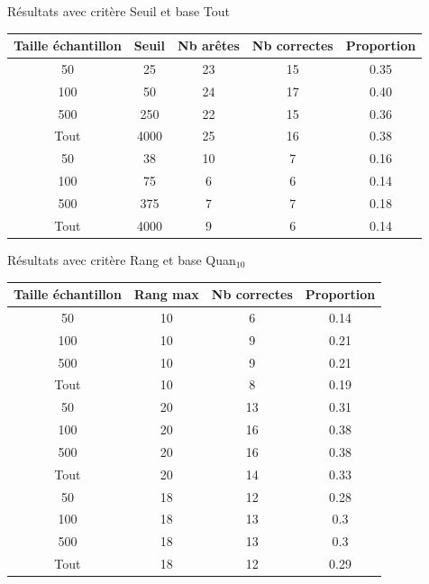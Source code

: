 \documentclass{beamer}
\begin{document}
\begin{frame}{Résultats avec critère Seuil et base Tout}

\begin{tabular}{|c|c|c|c|c|}
   \hline
   Taille échantillon & Seuil & Nb arêtes & Nb correctes & Proportion\\
   \hline
   50 & 25 & 23 & 15 & 0.35  \\
   \hline
   100 & 50 & 24 & 17 & 0.40  \\
   \hline
   500 & 250 & 22 & 15 & 0.36  \\
   \hline
   Tout & 4000 & 25 & 16 & 0.38 \\
   \hline
   \hline
   50 & 38 & 10 & 7 & 0.16  \\
   \hline
   100 & 75 & 6 & 6 & 0.14  \\
   \hline
   500 & 375 & 7 & 7 & 0.18  \\
   \hline
   Tout & 4000 & 9 & 6 & 0.14 \\
   \hline

\end{tabular}
\end{frame}


\begin{frame}{Résultats avec critère Rang et base Quan$_{10}$}

\begin{tabular}{|c|c|c|c|}
   \hline
   Taille échantillon & Rang max & Nb correctes & Proportion\\
   \hline
   50 & 10  & 6 & 0.14  \\
   \hline
   100 & 10  & 9 & 0.21  \\
   \hline
   500 & 10  & 9 & 0.21  \\
   \hline
   Tout & 10 & 8 & 0.19 \\
   \hline
   \hline
   50 & 20 & 13 & 0.31  \\
   \hline
   100 & 20 & 16 & 0.38  \\
   \hline
   500 & 20 & 16 & 0.38  \\
   \hline
   Tout & 20 & 14 & 0.33 \\
   \hline
   \hline
   50 & 18 & 12 & 0.28  \\
   \hline
   100 & 18 & 13 & 0.3  \\
   \hline
   500 & 18 & 13 & 0.3  \\
   \hline
	Tout & 18 & 12 & 0.29 \\
	\hline
\end{tabular}

\end{frame}
\end{document}
